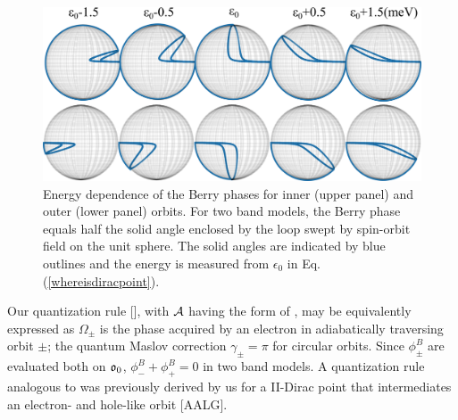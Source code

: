 \documentclass[aps, prb, showpacs, twocolumn, notitlepage, superscriptaddress]{revtex4-1}
\begin{document}

\begin{figure}
\includegraphics[width=1.0\columnwidth]{blochsphere.png}
\caption{Energy dependence of the Berry phases for inner (upper panel) and outer (lower panel) orbits. For two band models, the Berry phase equals half the solid angle enclosed by the loop swept by spin-orbit field on the unit sphere. The solid angles are indicated by blue outlines and the energy is measured from $\epsilon_0$ in Eq. (\ref{whereisdiracpoint}).\label{fig:blochsphere}}
\end{figure}

Our quantization rule [], with ${\cal A}$ having the form of , may be equivalently expressed as
$\Omega_{\pm}$ is the phase acquired by an electron in adiabatically traversing orbit $\pm$; the quantum Maslov correction $\gamma_{\pm}{=}\pi$ for circular orbits. Since $\phi^B_\pm$ are evaluated both on $\mathfrak{o}_0$, $\phi^B_-+\phi^B_+=0$ in two band models. A quantization rule analogous to  was previously derived by us for a II-Dirac point that intermediates an electron- and hole-like orbit [AALG]. 

\end{document}
